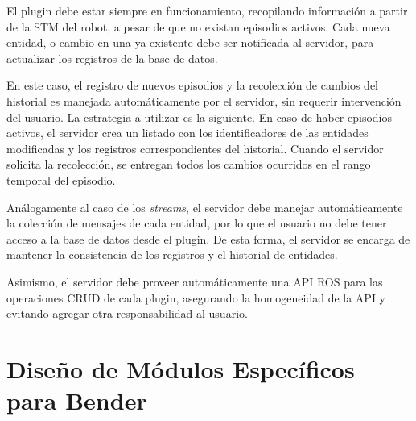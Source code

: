 El plugin debe estar siempre en funcionamiento, recopilando información a partir de la STM del robot, a pesar de que no existan episodios activos. Cada nueva entidad, o cambio en una ya existente debe ser notificada al servidor, para actualizar los registros de la base de datos. 

En este caso, el registro de nuevos episodios y la recolección de cambios del historial es manejada automáticamente por el servidor, sin requerir intervención del usuario. La estrategia a utilizar es la siguiente. En caso de haber episodios activos, el servidor crea un listado con los identificadores de las entidades modificadas y los registros correspondientes del historial. Cuando el servidor solicita la recolección, se entregan todos los cambios ocurridos en el rango temporal del episodio.

Análogamente al caso de los \textit{streams}, el servidor debe manejar automáticamente la colección de mensajes de cada entidad, por lo que el usuario no debe tener acceso a la base de datos desde el plugin. De esta forma, el servidor se encarga de mantener la consistencia de los registros y el historial de entidades.

Asimismo, el servidor debe proveer automáticamente una API ROS para las operaciones CRUD de cada plugin, asegurando la homogeneidad de la API y evitando agregar otra responsabilidad al usuario. 






\section{Diseño de Módulos Específicos para Bender}\label{sec:design_bender}

